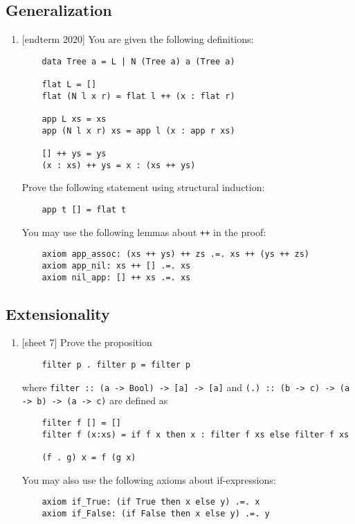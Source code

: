 \documentclass{article}
\def\code#1{\texttt{#1}}
\begin{document}
\subsection{Generalization}
\begin{enumerate}
    \item {[endterm 2020]} You are given the following definitions:
        \begin{verbatim}
    data Tree a = L | N (Tree a) a (Tree a)

    flat L = []
    flat (N l x r) = flat l ++ (x : flat r)

    app L xs = xs
    app (N l x r) xs = app l (x : app r xs)

    [] ++ ys = ys
    (x : xs) ++ ys = x : (xs ++ ys)
        \end{verbatim}
        Prove the following statement using structural induction:
        \begin{verbatim}
    app t [] = flat t
        \end{verbatim}
        You may use the following lemmas about \code{++} in the proof:
        \begin{verbatim}
    axiom app_assoc: (xs ++ ys) ++ zs .=. xs ++ (ys ++ zs)
    axiom app_nil: xs ++ [] .=. xs
    axiom nil_app: [] ++ xs .=. xs
        \end{verbatim}
\end{enumerate}

\subsection{Extensionality}
\begin{enumerate}
    \item {[sheet 7]} Prove the proposition
        \begin{verbatim}
    filter p . filter p = filter p
        \end{verbatim}
        where \code{filter :: (a -> Bool) -> [a] -> [a]} and \code{(.) :: (b -> c) -> (a -> b) -> (a -> c)} are defined as
        \begin{verbatim}
    filter f [] = []
    filter f (x:xs) = if f x then x : filter f xs else filter f xs

    (f . g) x = f (g x)
        \end{verbatim}
        You may also use the following axioms about if-expressions:
        \begin{verbatim}
    axiom if_True: (if True then x else y) .=. x
    axiom if_False: (if False then x else y) .=. y
        \end{verbatim}
\end{enumerate}
\end{document}
